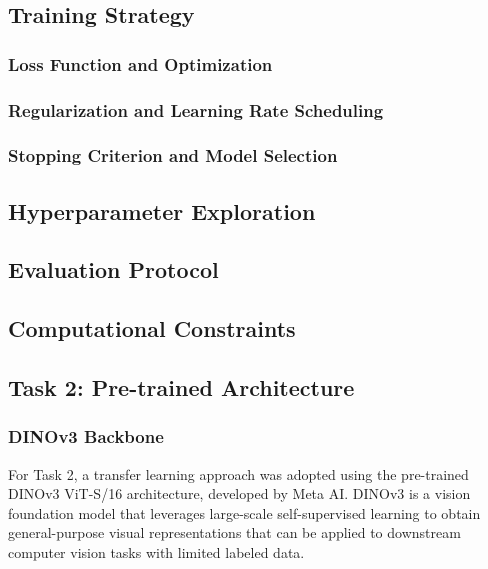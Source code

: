 \documentclass[conference]{IEEEtran}
\begin{document}
\subsection{Training Strategy}

\subsubsection{Loss Function and Optimization}

\subsubsection{Regularization and Learning Rate Scheduling}

\subsubsection{Stopping Criterion and Model Selection}


\subsection{Hyperparameter Exploration}


\subsection{Evaluation Protocol}


\subsection{Computational Constraints}


\subsection{Task 2: Pre-trained Architecture}
\label{sec:dinov3}

\subsubsection{DINOv3 Backbone}

For Task 2, a transfer learning approach was adopted
using the pre-trained DINOv3 ViT-S/16 architecture, developed by Meta AI.
DINOv3 is a vision foundation model that leverages
large-scale self-supervised learning to obtain
general-purpose visual representations that can be
applied to downstream computer vision tasks with
limited labeled data.
\end{document}
